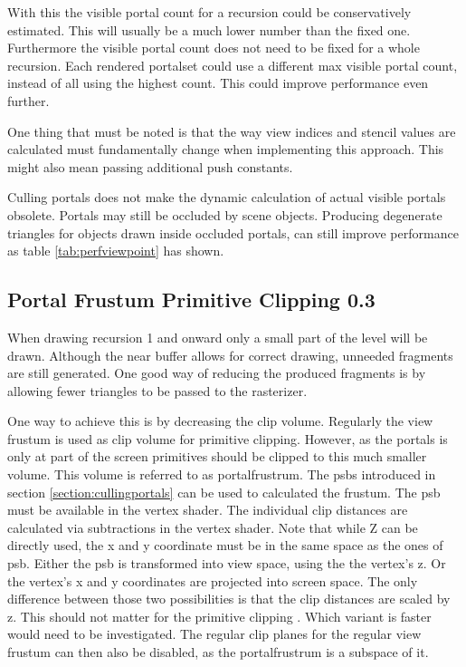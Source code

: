 With this the visible portal count for a recursion could be conservatively estimated. This will usually be a much lower number than the fixed one. Furthermore the visible portal count does not need to be fixed for a whole recursion. Each rendered \gls{portalset} could use a different max visible portal count, instead of all using the highest count. This could improve performance even further.

One thing that must be noted is that the way view indices and stencil values are calculated must fundamentally change when implementing this approach. This might also mean passing additional push constants.

Culling portals does not make the dynamic calculation of actual visible portals obsolete. Portals may still be occluded by scene objects. Producing degenerate triangles for objects drawn inside occluded portals, can still improve performance as table \ref{tab:perfviewpoint} has shown.

\subsection{Portal Frustum Primitive Clipping 0.3}
\label{section:portalprimitiveclipping}

When drawing recursion 1 and onward only a small part of the level will be drawn. Although the near buffer allows for correct drawing, unneeded fragments are still generated. One good way of reducing the produced fragments is by allowing fewer triangles to be passed to the rasterizer. 

One way to achieve this is by decreasing the clip volume. Regularly the view frustum is used as clip volume for primitive clipping. However, as the portals is only at part of the screen primitives should be clipped to this much smaller volume. This volume is referred to as \gls{portalfrustrum}. The \glspl{psb} introduced in section \ref{section:cullingportals} can be used to calculated the frustum. The \gls{psb} must be available in the vertex shader. The individual clip distances are calculated via subtractions in the vertex shader. Note that while Z can be directly used, the  x and y coordinate must be in the same space as the ones of \gls{psb}. Either the \gls{psb} is transformed into view space, using the the vertex's z. Or the vertex's x and y coordinates are projected into screen space. The only difference between those two possibilities is that the clip distances are scaled by z. This should not matter for the primitive clipping \cite{khronos:vulkan:spec1.1}.  Which variant is faster would need to be investigated. The regular clip planes for the regular view frustum can then also be disabled, as the \gls{portalfrustrum} is a subspace of it.


